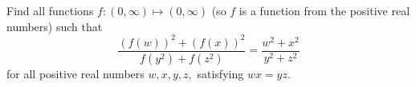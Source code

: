 Find all functions $ f: (0, \infty) \mapsto (0, \infty)$ (so $ f$ is a function from the positive real numbers) such that
\[ \frac {\left( f(w) \right)^2 + \left( f(x) \right)^2}{f(y^2) + f(z^2) } = \frac {w^2 + x^2}{y^2 + z^2}\]
for all positive real numbers $ w,x,y,z,$ satisfying $ wx = yz.$
